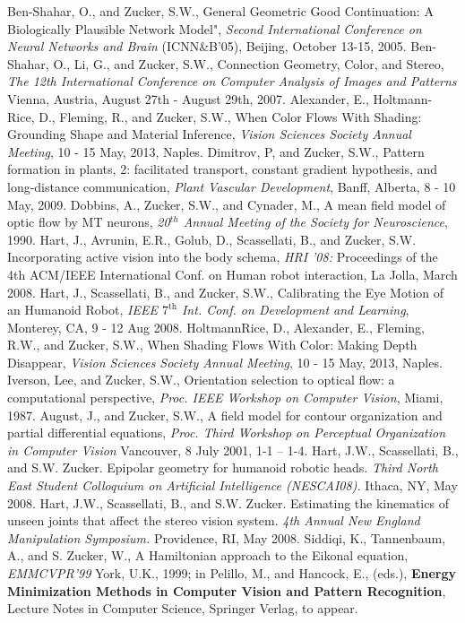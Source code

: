 Ben-Shahar, O., and Zucker, S.W., General Geometric Good Continuation: A Biologically Plausible Network Model", {\em Second International Conference on Neural Networks and Brain} (ICNN\&B'05), Beijing, October 13-15, 2005.
Ben-Shahar, O., Li, G., and Zucker, S.W., Connection Geometry, Color, and Stereo, {\em  The 12th International Conference on Computer Analysis of Images and Patterns} Vienna,  Austria, August 27th - August 29th, 2007.
Alexander, E., Holtmann-Rice, D., Fleming, R., and Zucker, S.W., When Color Flows With Shading: Grounding Shape and Material Inference, {\em Vision Sciences Society Annual Meeting}, 10 - 15 May, 2013, Naples.
Dimitrov, P, and Zucker, S.W., Pattern formation in plants, 2: facilitated transport, constant gradient hypothesis, and long-distance communication, {\em Plant Vascular Development}, Banff, Alberta, 8 - 10 May, 2009.
Dobbins, A., Zucker, S.W., and Cynader, M., A mean field model of optic flow by MT neurons, {\it 20$^{th}$ Annual Meeting of the Society for Neuroscience}, 1990.
Hart, J., Avrunin, E.R., Golub, D., Scassellati, B., and Zucker,	S.W. Incorporating active vision into the body schema, {\em HRI '08:} Proceedings of the 4th ACM/IEEE International Conf. on Human robot interaction, La Jolla, March 2008.
Hart, J., Scassellati, B., and Zucker, S.W., Calibrating the Eye Motion of an Humanoid Robot, {\em IEEE $7^{\mathrm{th}}$ Int. Conf. on Development and Learning}, Monterey, CA, 9 - 12 Aug 2008.
Holtmann­Rice, D., Alexander, E., Fleming, R.W., and Zucker, S.W., When Shading Flows With Color: Making Depth Disappear, {\em Vision Sciences Society Annual Meeting}, 10 - 15 May, 2013, Naples.
Iverson, Lee, and Zucker, S.W., Orientation selection to optical flow: a computational perspective, {\it Proc. IEEE Workshop on Computer Vision}, Miami, 1987.
August, J., and Zucker, S.W., A field model for contour organization and partial differential equations, {\it Proc. Third Workshop on Perceptual Organization in Computer Vision} Vancouver, 8 July 2001, 1-1 -- 1-4.
Hart, J.W., Scassellati, B., and S.W. Zucker. Epipolar geometry for humanoid robotic heads. {\em Third North East Student Colloquium on Artificial Intelligence (NESCAI08).} Ithaca, NY, May 2008.
Hart, J.W., Scassellati, B., and S.W. Zucker. Estimating the kinematics of unseen joints that affect the stereo vision system. {\em 4th Annual New England Manipulation Symposium.} Providence, RI, May 2008.
Siddiqi, K., Tannenbaum, A., and S. Zucker, W., A Hamiltonian approach to the Eikonal equation, {\em EMMCVPR'99} York, U.K., 1999; in Pelillo, M., and Hancock, E., (eds.), {\bf Energy Minimization Methods in Computer Vision and Pattern Recognition}, Lecture Notes in Computer Science, Springer Verlag, to appear.
